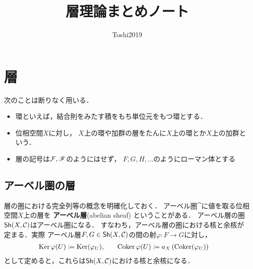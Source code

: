 


\def\inner<#1>{\langle #1 \rangle}

\def\ind<#1>{\mathop{\text{``}\hspace{-0.7pt}#1\limits\hspace{-1.5pt}\text{''}}}







\title{層理論まとめノート}
\author{Toshi2019}

\maketitle
\frontmatter
\tableofcontents
\layout
\mainmatter
\chapter{層}



\begin{CNV}次のことは断りなく用いる．
    \begin{itemize}
        \item 環といえば，結合則をみたす積をもち単位元をもつ環とする．
        \item 位相空間$X$に対し，
        $X$上の環や加群の層をたんに$X$上の環とか$X$上の加群という．
        \item 層の記号は$\mathcal{F},\mathscr{F}$のようにはせず，
        $F,G,H,\ldots$のようにローマン体とする
    \end{itemize}
\end{CNV}

\section{アーベル圏の層}
層の圏における完全列等の概念を明確化しておく．
アーベル圏$\cat$に値を取る位相空間$X$上の層を
\textbf{アーベル層}(abelian sheaf) ということがある．
アーベル層の圏$\mathop{\textsf{Sh}}\nolimits(X,\mathcal{C})$はアーベル圏になる．
すなわち，アーベル層の圏における核と余核が定まる．実際
アーベル層$F,G\in\mathop{\textsf{Sh}}\nolimits(X,\mathcal{C})$の間の射$\varphi\colon F\to G$に対し，
\begin{alignat*}{2}
    \mathop{\mathrm{Ker}}\nolimits\varphi(U)&\coloneqq\mathop{\mathrm{Ker}}\nolimits(\varphi_U), 
    &\quad 
    \mathop{\mathrm{Coker}}\nolimits\varphi(U)&\coloneqq a_X\left(\mathop{\mathrm{Coker}}\nolimits(\varphi_U)\right)
\end{alignat*}
として定めると，これらは$\mathop{\textsf{Sh}}\nolimits(X,\mathcal{C})$における核と余核になる．

